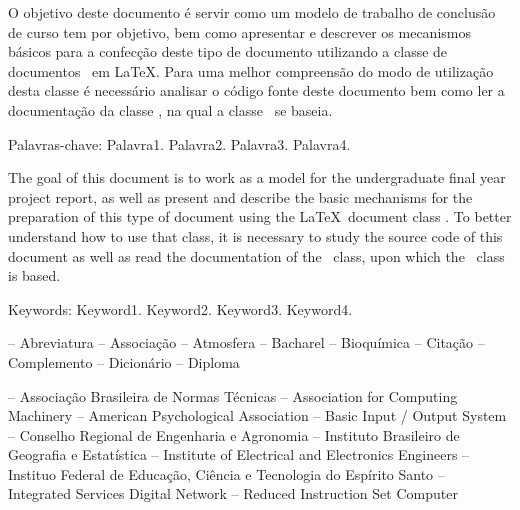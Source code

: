 \documentclass[times,english,brazilian,oneside,section=TITLE]{ifes8}
\begin{document}
\begin{resumo}
  O objetivo deste documento é servir como um modelo de trabalho de
  conclusão de curso tem por objetivo, bem como apresentar e descrever
  os mecanismos básicos para a confecção deste tipo de documento
  utilizando a classe de documentos \ifestex\ em \LaTeX.
  Para uma melhor compreensão do modo de utilização desta classe é
  necessário analisar o código fonte deste documento bem como ler a
  documentação da classe \abnTeX, na qual a classe \ifestex\ se
  baseia.

  Palavras-chave: Palavra1. Palavra2. Palavra3. Palavra4.
\end{resumo}

\begin{resumo}[Abstract]
  \begin{otherlanguage}{english}
    The goal of this document is to work as a model for the
    undergraduate final year project report, as well as present and
    describe the basic mechanisms for the preparation of this type of
    document using the \LaTeX\ document class \ifestex.
    To better understand how to use that class, it is necessary to
    study the source code of this document as well as read the
    documentation of the \abnTeX\ class, upon which the \ifestex\
    class is based.

    Keywords: Keyword1. Keyword2. Keyword3. Keyword4.
  \end{otherlanguage}
\end{resumo}


\renewcommand{\listfigurename}{Lista de figuras}
\pdfbookmark[0]{\listfigurename}{lof}
\listoffigures*
\cleardoublepage


\listoftables*
\cleardoublepage


\listadequadros*
\cleardoublepage


\begin{abreviaturas}
   -- Abreviatura
   -- Associação
   -- Atmosfera
   -- Bacharel
   -- Bioquímica
   -- Citação
   -- Complemento
   -- Dicionário
   -- Diploma
\end{abreviaturas}


\begin{siglas}
   -- Associação Brasileira de Normas Técnicas
   -- Association for Computing Machinery
   -- American Psychological Association
   -- Basic Input / Output System
   -- Conselho Regional de Engenharia e Agronomia
   -- Instituto Brasileiro de Geografia e Estatística
  \simb{IEEE} -- Institute of Electrical and Electronics Engineers
  \simb{Ifes} -- Instituo Federal de Educação, Ciência e Tecnologia do Espírito Santo
  \simb{ISDN} -- Integrated Services Digital Network
   -- Reduced Instruction Set Computer
\end{siglas}
\end{document}
